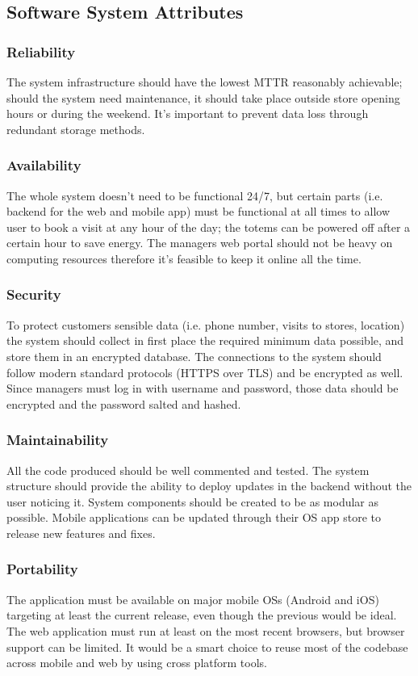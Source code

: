 \subsection{Software System Attributes}
\subsubsection{Reliability}
The system infrastructure should have the lowest MTTR reasonably achievable; should the system need maintenance, it should take place outside store opening hours or during the weekend. It's important to prevent data loss through redundant storage methods.

\subsubsection{Availability}
The whole system doesn't need to be functional 24/7, but certain parts (i.e. backend for the web and mobile app) must be functional at all times to allow user to book a visit at any hour of the day; the totems can be powered off after a certain hour to save energy. The managers web portal should not be heavy on computing resources therefore it's feasible to keep it online all the time.

\subsubsection{Security}
To protect customers sensible data (i.e. phone number, visits to stores, location) the system should collect in first place the required minimum data possible, and store them in an encrypted database. The connections to the system should follow modern standard protocols (HTTPS over TLS) and be encrypted as well. Since managers must log in with username and password, those data should be encrypted and the password salted and hashed.

\subsubsection{Maintainability}
All the code produced should be well commented and tested. The system structure should provide the ability to deploy updates in the backend without the user noticing it. 
System components should be created to be as modular as possible. 
Mobile applications can be updated through their OS app store to release new features and fixes.

\subsubsection{Portability}
The application must be available on major mobile OSs (Android and iOS) targeting at least the current release, even though the previous would be ideal.
The web application must run at least on the most recent browsers, but browser support can be limited.
It would be a smart choice to reuse most of the codebase across mobile and web by using cross platform tools.